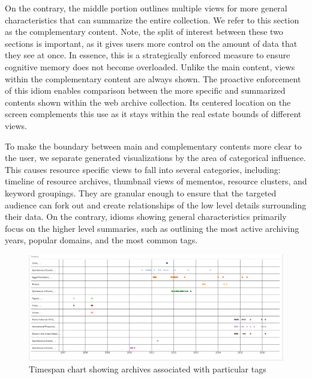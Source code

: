 \documentclass[10pt,journal,compsoc]{IEEEtran}
\begin{document}
On the contrary, the middle portion outlines multiple views for more general characteristics that can summarize the entire collection. We refer to this section as the complementary content. Note, the split of interest between these two sections is important, as it gives users more control on the amount of data that they see at once. In essence, this is a strategically enforced measure to ensure cognitive memory does not become overloaded. Unlike the main content, views within the complementary content are always shown. The proactive enforcement of this idiom enables comparison between the more specific and summarized contents shown within the web archive collection. Its centered location on the screen complements this use as it stays within the real estate bounds of different views. \par

To make the boundary between main and complementary contents more clear to the user, we separate generated visualizations by the area of categorical influence. This causes resource specific views to fall into several categories, including: timeline of resource archives, thumbnail views of mementos, resource clusters, and keyword groupings. They are granular enough to ensure that the targeted audience can fork out and create relationships of the low level details surrounding their data. On the contrary, idioms showing general characteristics primarily focus on the higher level summaries, such as outlining the most active archiving years, popular domains, and the most common tags. \par 

\begin{figure}
\centering
\includegraphics[width=\textwidth]{Figure4}
\caption{Timespan chart showing archives associated with particular tags}
\label{fig:mesh3}
\end{figure}
\end{document}

